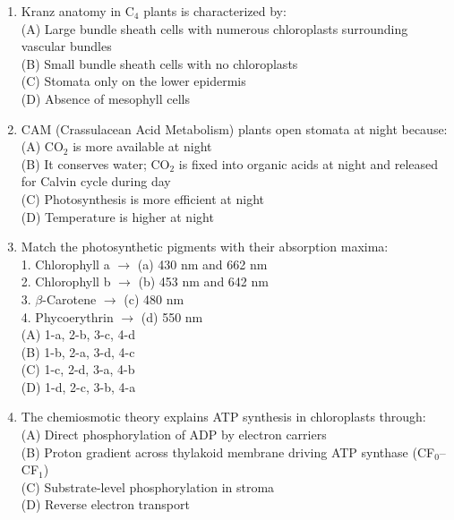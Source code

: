 \documentclass{article}
\begin{document}
\begin{enumerate}[label=Q\arabic*.]
\item Kranz anatomy in C$_4$ plants is characterized by:
\\(A) Large bundle sheath cells with numerous chloroplasts surrounding vascular bundles
\\(B) Small bundle sheath cells with no chloroplasts
\\(C) Stomata only on the lower epidermis
\\(D) Absence of mesophyll cells

\item CAM (Crassulacean Acid Metabolism) plants open stomata at night because:
\\(A) CO$_2$ is more available at night
\\(B) It conserves water; CO$_2$ is fixed into organic acids at night and released for Calvin cycle during day
\\(C) Photosynthesis is more efficient at night
\\(D) Temperature is higher at night

\item Match the photosynthetic pigments with their absorption maxima:\\
1. Chlorophyll a $\rightarrow$ (a) 430 nm and 662 nm\\
2. Chlorophyll b $\rightarrow$ (b) 453 nm and 642 nm\\
3. $\beta$-Carotene $\rightarrow$ (c) 480 nm\\
4. Phycoerythrin $\rightarrow$ (d) 550 nm
\\(A) 1-a, 2-b, 3-c, 4-d
\\(B) 1-b, 2-a, 3-d, 4-c
\\(C) 1-c, 2-d, 3-a, 4-b
\\(D) 1-d, 2-c, 3-b, 4-a

\item The chemiosmotic theory explains ATP synthesis in chloroplasts through:
\\(A) Direct phosphorylation of ADP by electron carriers
\\(B) Proton gradient across thylakoid membrane driving ATP synthase (CF$_0$--CF$_1$)
\\(C) Substrate-level phosphorylation in stroma
\\(D) Reverse electron transport

\end{enumerate}
\end{document}

